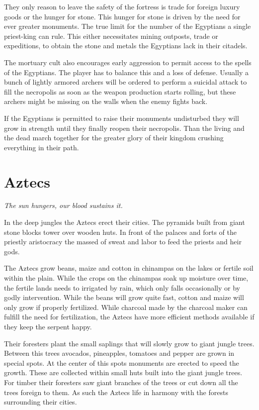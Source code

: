 \documentclass[a4paper]{book}
\begin{document}
		They only reason to leave the safety of the fortress is trade for foreign luxury
		goods or the hunger for stone.
		This hunger for stone is driven by the need for ever greater monuments.
		The true limit for the number of the \gls{Egyptians} a single priest-king
		can rule.
		This either necessitates mining outposts, trade or expeditions,
		to obtain the stone and metals the \gls{Egyptians} lack in their citadels.

		The mortuary cult also encourages early aggression to permit access to the
		spells of the \gls{Egyptians}.
		The player has to balance this and a loss of defense.
		Usually a bunch of lightly armored archers will be ordered to perform
		a suicidal attack to fill the necropolis as soon as the weapon production
		starts rolling,
		but these archers might be missing on the walls when the enemy fights back.

		If the \gls{Egyptians} is permitted to raise their monuments undisturbed
		they will grow in strength until they finally reopen their necropolis.
		Than the living and the dead march together for the greater glory
		of their kingdom crushing everything in their path.

\section{\Gls{Aztecs}}

	\begin{flushright}
		\emph{The sun hungers, our blood sustains it.}
	\end{flushright}

	In the deep jungles the \gls{Aztecs} erect their cities.
	The pyramids built from giant stone blocks tower over wooden huts.
	In front of the palaces and forts of the priestly aristocracy the massed of sweat 
	and labor to feed the priests and heir gods.

	The \gls{Aztecs} grow beans, maize and cotton in chinampas on the lakes or fertile soil within the plain.
	While the crops on the chinampas soak up moisture over time,
	the fertile lands needs to irrigated by rain, which only falls occasionally or by godly intervention.
	While the beans will grow quite fast, cotton and maize will only grow if properly fertilized.
	While charcoal made by the charcoal maker can fulfill the need for fertilization,
	the \gls{Aztecs} have more efficient methods available if they keep the serpent happy.

	Their foresters plant the small saplings that will slowly grow to giant jungle trees.
	Between this trees avocados, pineapples, tomatoes and pepper are grown in special spots.
	At the center of this spots monuments are erected to speed the growth.
	These are collected within small huts built into the giant jungle trees.
	For timber their foresters saw giant branches of the trees or cut down all the trees foreign to them.
	As such the \gls{Aztecs} life in harmony with the forests surrounding their cities.
\end{document}

